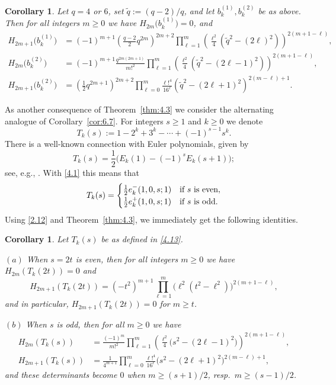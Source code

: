 \documentclass{amsart}
\theoremstyle{plain}
\newtheorem{corollary}[theorem]{Corollary}
\numberwithin{equation}{section}
\begin{document}
\begin{corollary}\label{cor:4.4}
Let $q=4$ or $6$, set $\widetilde{q}:=(q-2)/q$, and let $b_k^{(1)}, b_k^{(2)}$
be as above. Then for all integers $m\geq 0$ we have 
$H_{2m}\big(b_k^{(1)}\big)=0$, and
\begin{align*}
H_{2m+1}\big(b_k^{(1)}\big)&=(-1)^{m+1}\left(\frac{q-2}{2}q^{2m}\right)^{2m+2}
\prod_{\ell=1}^m\left(\frac{\ell^2}{4}\left({\widetilde{q}}^2-(2\ell)^2\right)\right)^{2(m+1-\ell)},\\
H_{2m}\big(b_k^{(2)}\big) &=(-1)^{m+1}\frac{q^{2m(2m+1)}}{m!^2}
\prod_{\ell=1}^m\left(\frac{\ell^2}{4}\left(\widetilde{q}^2-(2\ell-1)^2\right)\right)^{2(m+1-\ell)}, \\
H_{2m+1}\big(b_k^{(2)}\big) &=\left(\frac{1}{2}q^{2m+1}\right)^{2m+2}
\prod_{\ell=0}^m\frac{\ell!^4}{16^\ell}
\left(\widetilde{q}^2-(2\ell+1)^2\right)^{2(m-\ell)+1}.
\end{align*}
\end{corollary}


As another consequence of Theorem~\ref{thm:4.3} we consider the alternating analogue
of Corollary~\ref{cor:6.7}. For integers $s\geq 1$ and $k\geq 0$ we denote
\begin{equation}\label{4.13}
T_k(s) := 1-2^k+3^k-\cdots+(-1)^{s-1}s^k.
\end{equation}
There is a well-known connection with Euler polynomials, given by
\[
T_k(s) = \frac{1}{2}\big(E_k(1)-(-1)^sE_k(s+1)\big);
\]
see, e.g., \cite[Eq.~24.4.10]{DLMF}. With \eqref{4.1} this means that
\[
T_k(s) = \begin{cases}
\tfrac{1}{2}e_k^{-}(1,0,s;1) &\hbox{if $s$ is even},\\
\tfrac{1}{2}e_k^{+}(1,0,s;1) &\hbox{if $s$ is odd}.
\end{cases}
\]
Using \eqref{2.12} and Theorem~\ref{thm:4.3}, we immediately get the following
identities.

\begin{corollary}\label{cor:4.5}
Let $T_k(s)$ be as defined in \eqref{4.13}. 

$(a)$ When $s=2t$ is even, then for all integers $m\geq 0$ we have 
$H_{2m}(T_k(2t))=0$ and
\[
H_{2m+1}(T_k(2t))=\left(-t^2\right)^{m+1}\prod_{\ell=1}^m
\big(\ell^2(t^2-\ell^2)\big)^{2(m+1-\ell)},
\]
and in particular, $H_{2m+1}(T_k(2t))=0$ for $m\geq t$.

$(b)$ When $s$ is odd, then for all $m\geq 0$ we have  
\begin{align*}
H_{2m}(T_k(s))&=\frac{(-1)^m}{m!^2}\prod_{\ell=1}^m
\left(\frac{\ell^2}{4}\big(s^2-(2\ell-1)^2\big)\right)^{2(m+1-\ell)},\\
H_{2m+1}(T_k(s))&=\frac{1}{4^{m+1}}\prod_{\ell=0}^m
\frac{\ell!^4}{16^\ell}\big(s^2-(2\ell+1)^2\big)^{2(m-\ell)+1},
\end{align*}
and these determinants become $0$ when $m\geq(s+1)/2$, resp.\ $m\geq(s-1)/2$.
\end{corollary}
\end{document}
